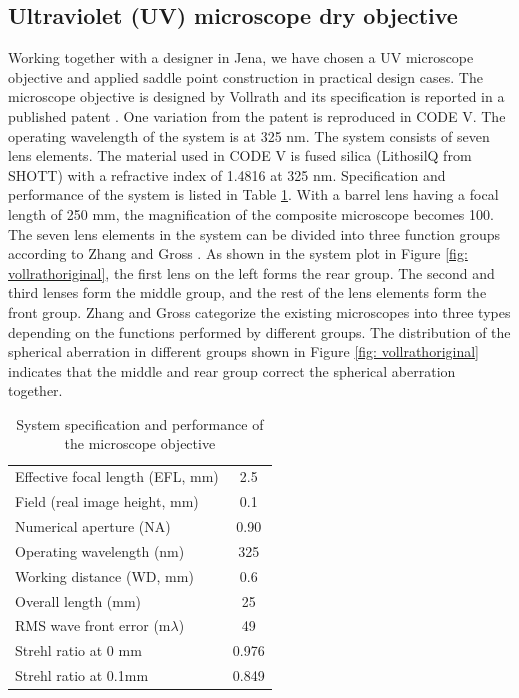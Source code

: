 \subsection{Ultraviolet (UV) microscope dry objective}
Working together with a designer in Jena, we have chosen a UV microscope objective and applied saddle point construction in practical design cases. The microscope objective is designed by Vollrath and its specification is reported in a published patent \cite{patentvollrath}. One variation from the patent is reproduced in CODE V. The operating wavelength of the system is at 325 nm. The system consists of seven lens elements. The material used in CODE V is fused silica (LithosilQ from SHOTT) with a refractive index of 1.4816 at 325 nm. Specification and performance of the system is listed in Table \ref{table: vollrathspec}. With a barrel lens having a focal length of 250 mm, the magnification of the composite microscope becomes 100. The seven lens elements in the system can be divided into three function groups according to Zhang and Gross \cite{ZhangMicroscope2017}. As shown in the system plot in Figure \ref{fig: vollrathoriginal}, the first lens on the left forms the rear group. The second and third lenses form the middle group, and the rest of the lens elements form the front group. Zhang and Gross categorize the existing microscopes into three types depending on the functions performed by different groups. The distribution of the spherical aberration in different groups shown in Figure \ref{fig: vollrathoriginal} indicates that the middle and rear group correct the spherical aberration together. 

\setlength{\arrayrulewidth}{.5mm}
\setlength{\tabcolsep}{18pt}
\renewcommand{\arraystretch}{1.2}
\begin{table}[h!]
    \centering
    \captionsetup{justification=centering}
    \caption{System specification and performance of the microscope objective}
    \label{table: vollrathspec}
    \vspace{-1em}
    \begin{tabular}{ p{15em}  c }
    \hline 
    Effective focal length (EFL, mm) & 2.5\\ 
    Field (real image height, mm) & 0.1\\ 
    Numerical aperture (NA) & 0.90\\ 
    Operating wavelength (nm) & 325\\ 
    Working distance (WD, mm) & 0.6\\ 
    Overall length (mm) & 25\\
    \midrule
    RMS wave front error (m$\lambda$) & 49\\ 
    Strehl ratio at 0 mm & 0.976\\ 
    Strehl ratio at 0.1mm & 0.849\\
    \hline
    \end{tabular}
\end{table}

